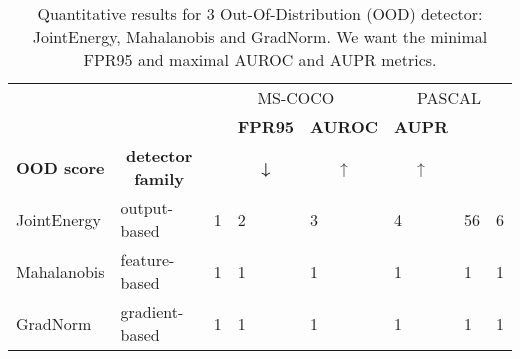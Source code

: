 \begin{table}[]
\begin{tabular}{llllllll}
\hline
                    & \multicolumn{1}{c}{}                         & \multicolumn{3}{c}{MS-COCO}                                                                & \multicolumn{3}{c}{PASCAL}                                          \\
                    &                                              & \multicolumn{1}{c}{\textbf{}} & \multicolumn{1}{c}{\textbf{FPR95}} & \textbf{AUROC}        & \textbf{AUPR}         & \textbf{}            & \textbf{}            \\
\textbf{OOD score} & \multicolumn{1}{c}{\textbf{detector family}} & \multicolumn{1}{c}{\textbf{}} & \multicolumn{1}{c}{\textbf{↓}}     & \multicolumn{1}{c}{↑} & \multicolumn{1}{c}{↑} & \multicolumn{1}{c}{} & \multicolumn{1}{c}{} \\ \hline
JointEnergy        & output-based                                 & 1                             & 2                                  & 3                     & 4                     & 56                   & 6                    \\
Mahalanobis        & feature-based                                & 1                             & 1                                  & 1                     & 1                     & 1                    & 1                    \\
GradNorm           & gradient-based                               & 1                             & 1                                  & 1                     & 1                     & 1                    & 1                    \\ \hline
\end{tabular}
\caption{Quantitative results for 3 Out-Of-Distribution (OOD) detector: JointEnergy, Mahalanobis and GradNorm. We want the minimal FPR95 and maximal AUROC and AUPR metrics.}
\label{experiments:table1}
\end{table}